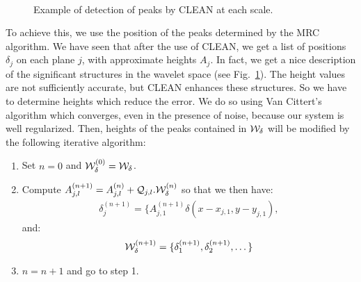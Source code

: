 \documentclass[11pt,a4paper]{article}
\begin{document}
\begin{figure}[htb]
\centerline{
\hbox{
}}
\caption{Example of detection of peaks by CLEAN at each scale.}
\label{fig_pic}
\end{figure}

To achieve this, we use the position of the
peaks determined by the MRC algorithm. We have seen that after
the use of CLEAN, we get a list of positions $\delta_j$ on each plane $j$, with
 approximate heights $A_j$. In fact, we get a nice description
 of the significant structures in the wavelet space (see Fig.\ \ref{fig_pic}). 
The height values are not sufficiently accurate, 
but CLEAN enhances these structures.
So we have to determine heights which reduce the error. 
We do so using Van Cittert's algorithm \cite{rest:vancittert31}
which converges, even in the presence of noise,
because our system is well regularized. Then, heights of the peaks
contained in ${\cal W}_{\delta}$ will be modified by the following
iterative algorithm:

\begin{enumerate}
\item Set $n = 0$ and ${\cal W}_{\delta}^{(0)} = {\cal W}_{\delta}$.
\item Compute $A_{j,l}^{(n+1)}  = A_{j,l}^{(n)} + 
{\cal Q}_{j,l}.{\cal W}_{\delta}^{(n)}$
so that we then have:
\begin{eqnarray*}
\delta_j^{(n+1)} = \{ A_{j,1}^{(n+1)} \delta(x-x_{j,1}, y-y_{j,1}),  
\end{eqnarray*}
and:
\begin{eqnarray*}
{\cal W}_{\delta}^{(n+1)} =  \{\delta_1^{(n+1)}, \delta_2^{(n+1)}, \dots\}
\end{eqnarray*}
\item $n = n + 1$ and go to step 1.
\end{enumerate}
\end{document}
